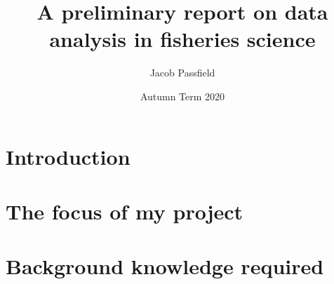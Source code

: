 \documentclass{article}
\title{\huge{\bf{A preliminary report on data analysis in fisheries science}}}
\author{Jacob Passfield}
\date{Autumn Term 2020}
\begin{document}
\maketitle

\section{Introduction}
\section{The focus of my project}
\section{Background knowledge required}
\end{document}
